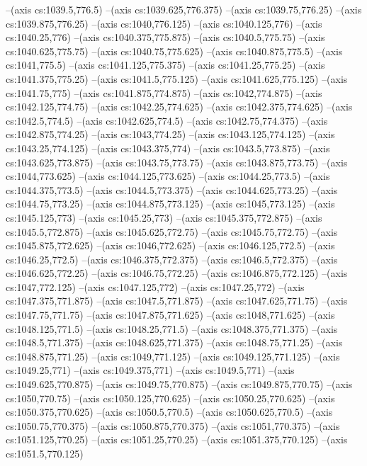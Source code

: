 --(axis cs:1039.5,776.5)
--(axis cs:1039.625,776.375)
--(axis cs:1039.75,776.25)
--(axis cs:1039.875,776.25)
--(axis cs:1040,776.125)
--(axis cs:1040.125,776)
--(axis cs:1040.25,776)
--(axis cs:1040.375,775.875)
--(axis cs:1040.5,775.75)
--(axis cs:1040.625,775.75)
--(axis cs:1040.75,775.625)
--(axis cs:1040.875,775.5)
--(axis cs:1041,775.5)
--(axis cs:1041.125,775.375)
--(axis cs:1041.25,775.25)
--(axis cs:1041.375,775.25)
--(axis cs:1041.5,775.125)
--(axis cs:1041.625,775.125)
--(axis cs:1041.75,775)
--(axis cs:1041.875,774.875)
--(axis cs:1042,774.875)
--(axis cs:1042.125,774.75)
--(axis cs:1042.25,774.625)
--(axis cs:1042.375,774.625)
--(axis cs:1042.5,774.5)
--(axis cs:1042.625,774.5)
--(axis cs:1042.75,774.375)
--(axis cs:1042.875,774.25)
--(axis cs:1043,774.25)
--(axis cs:1043.125,774.125)
--(axis cs:1043.25,774.125)
--(axis cs:1043.375,774)
--(axis cs:1043.5,773.875)
--(axis cs:1043.625,773.875)
--(axis cs:1043.75,773.75)
--(axis cs:1043.875,773.75)
--(axis cs:1044,773.625)
--(axis cs:1044.125,773.625)
--(axis cs:1044.25,773.5)
--(axis cs:1044.375,773.5)
--(axis cs:1044.5,773.375)
--(axis cs:1044.625,773.25)
--(axis cs:1044.75,773.25)
--(axis cs:1044.875,773.125)
--(axis cs:1045,773.125)
--(axis cs:1045.125,773)
--(axis cs:1045.25,773)
--(axis cs:1045.375,772.875)
--(axis cs:1045.5,772.875)
--(axis cs:1045.625,772.75)
--(axis cs:1045.75,772.75)
--(axis cs:1045.875,772.625)
--(axis cs:1046,772.625)
--(axis cs:1046.125,772.5)
--(axis cs:1046.25,772.5)
--(axis cs:1046.375,772.375)
--(axis cs:1046.5,772.375)
--(axis cs:1046.625,772.25)
--(axis cs:1046.75,772.25)
--(axis cs:1046.875,772.125)
--(axis cs:1047,772.125)
--(axis cs:1047.125,772)
--(axis cs:1047.25,772)
--(axis cs:1047.375,771.875)
--(axis cs:1047.5,771.875)
--(axis cs:1047.625,771.75)
--(axis cs:1047.75,771.75)
--(axis cs:1047.875,771.625)
--(axis cs:1048,771.625)
--(axis cs:1048.125,771.5)
--(axis cs:1048.25,771.5)
--(axis cs:1048.375,771.375)
--(axis cs:1048.5,771.375)
--(axis cs:1048.625,771.375)
--(axis cs:1048.75,771.25)
--(axis cs:1048.875,771.25)
--(axis cs:1049,771.125)
--(axis cs:1049.125,771.125)
--(axis cs:1049.25,771)
--(axis cs:1049.375,771)
--(axis cs:1049.5,771)
--(axis cs:1049.625,770.875)
--(axis cs:1049.75,770.875)
--(axis cs:1049.875,770.75)
--(axis cs:1050,770.75)
--(axis cs:1050.125,770.625)
--(axis cs:1050.25,770.625)
--(axis cs:1050.375,770.625)
--(axis cs:1050.5,770.5)
--(axis cs:1050.625,770.5)
--(axis cs:1050.75,770.375)
--(axis cs:1050.875,770.375)
--(axis cs:1051,770.375)
--(axis cs:1051.125,770.25)
--(axis cs:1051.25,770.25)
--(axis cs:1051.375,770.125)
--(axis cs:1051.5,770.125)
